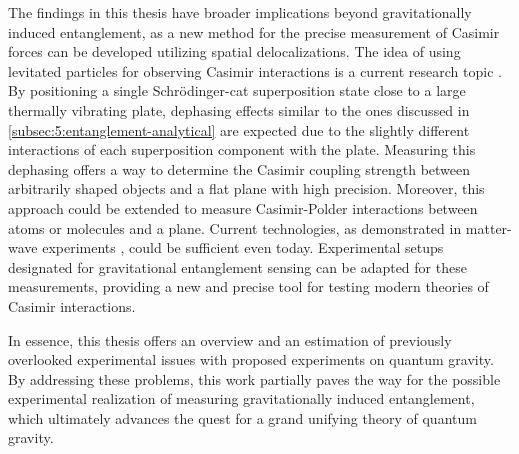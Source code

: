 The findings in this thesis have broader implications beyond gravitationally induced entanglement, as a new method for the precise measurement of Casimir forces can be developed utilizing spatial delocalizations.
The idea of using levitated particles for observing Casimir interactions is a current research topic \cite{Xu_2024}.
By positioning a single Schrödinger-cat superposition state close to a large thermally vibrating plate, dephasing effects similar to the ones discussed in \cref{subsec:5:entanglement-analytical} are expected due to the slightly different interactions of each superposition component with the plate.
Measuring this dephasing offers a way to determine the Casimir coupling strength between arbitrarily shaped objects and a flat plane with high precision.
Moreover, this approach could be extended to measure Casimir-Polder interactions between atoms or molecules and a plane.
Current technologies, as demonstrated in matter-wave experiments \cite{Fein_2019}, could be sufficient even today.
Experimental setups designated for gravitational entanglement sensing can be adapted for these measurements, providing a new and precise tool for testing modern theories of Casimir interactions.



In essence, this thesis offers an overview and an estimation of previously overlooked experimental issues with proposed experiments on quantum gravity.
By addressing these problems, this work partially paves the way for the possible experimental realization of measuring gravitationally induced entanglement, which ultimately advances the quest for a grand unifying theory of quantum gravity. 







